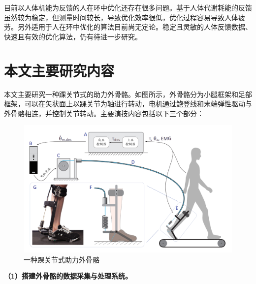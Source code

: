 目前以人体机能为反馈的人在环中优化还存在很多问题。基于人体代谢耗能的反馈虽然较为稳定，但测量时间较长，导致优化效率很低，优化过程容易导致人体疲劳。另外适用于人在环中优化的算法目前尚无定论。稳定且灵敏的人体反馈数据、快速且有效的优化算法，仍有待进一步研究。

\section{本文主要研究内容}

本文主要研究一种踝关节式的助力外骨骼\cite{p42}。如图所示，外骨骼分为小腿框架和足部框架，可以在矢状面上以踝关节为轴进行转动，电机通过鲍登线和末端弹性驱动与外骨骼相连，并控制关节转动。主要演技内容包括以下三个部分：

\begin{figure}[htb]
    \includegraphics[width=15cm]{fig/f19.png}
    \caption{一种踝关节式助力外骨骼\cite{p43}}
    \label{fig:mark}
\end{figure}

\textbf{（1）搭建外骨骼的数据采集与处理系统。}
